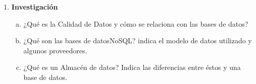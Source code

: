 \documentclass[letterpaper,11pt]{article}
\begin{document}
\begin{enumerate}
\begin{enumerate}[a. ]
    \end{enumerate}

    \item \textbf{Investigación}
    \begin{enumerate}[a)]

        \item ¿Qué es la Calidad de Datos y cómo se relaciona con las bases de datos?

        \item ¿Qué son las bases de datosNoSQL? indica el modelo de datos utilizado y algunos proveedores.

        \item ¿Qué es un Almacén de datos? Indica las diferencias entre éstos y una base de datos.

    \end{enumerate}
\end{enumerate}
\end{document}
